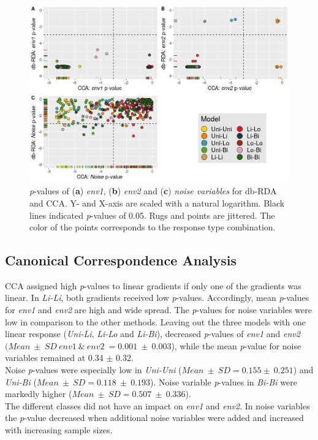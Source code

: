 		\begin{figure}[h!]
			\centering
			\includegraphics[width=1\linewidth]{../02_Figures/P-Compare}
			\caption{
				\textit{p}-values of (\textbf{a}) \textit{env1},   (\textbf{b}) \textit{env2} and (\textbf{c}) \textit{noise variables} for db-RDA and CCA. Y- and X-axis are scaled with a natural logarithm. Black lines indicated \textit{p}-values of 0.05. Rugs and points are jittered. The color of the points corresponds to the response type combination. 
			}
			\label{fig:p-compare}
		\end{figure}


	\subsection{Canonical Correspondence Analysis}

		CCA assigned high \textit{p}-values to linear gradients if only one of the gradients was linear.
		In \textit{Li-Li}, both gradients received low \textit{p}-values.
		Accordingly, mean \textit{p}-values for \textit{env1} and \textit{env2} are high and wide spread. 
		The \textit{p}-values for noise variables were low in comparison to the other methods.
		Leaving out the three models with one linear response (\textit{Uni-Li}, \textit{Li-Lo} and \textit{Li-Bi}), decreased \textit{p}-values of \textit{env1} and \textit{env2} $(Mean\ \pm\ SD\ \scriptscriptstyle env1\ \&\  env2\ \textstyle = 0.001\ \pm\ 0.003$), while the mean \textit{p}-value for noise variables remained at 0.34 $\pm$ 0.32.\\
		Noise \textit{p}-values were especially low in \textit{Uni-Uni} ($Mean\ \pm\ SD = 0.155 \pm\ 0.251$) and \textit{Uni-Bi} ($Mean\ \pm\ SD = 0.118\ \pm\ 0.193$). 
		Noise variable \textit{p}-values in \textit{Bi-Bi} were markedly higher ($Mean\ \pm\ SD = 0.507\ \pm\ 0.336$). \\
		The different classes did not have an impact on \textit{env1} and \textit{env2}. 
		In noise variables the \textit{p}-value decreased when additional noise variables were added and increased with increasing sample sizes. \\
	

